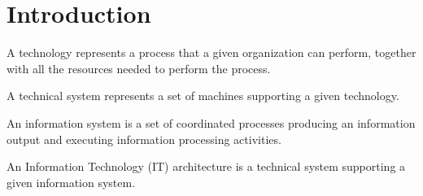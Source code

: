 \section{Introduction}

\begin{definition}
    A technology represents a process that a given organization can perform, together with all the resources needed to perform the process. 
\end{definition}
\begin{definition}
    A technical system represents a set of machines supporting a given technology.
\end{definition}
\begin{definition}
    An information system is a set of coordinated processes producing an information output and executing information processing activities. 
\end{definition}
\begin{definition}
    An Information Technology (IT) architecture is a technical system supporting a given information system.
\end{definition}

